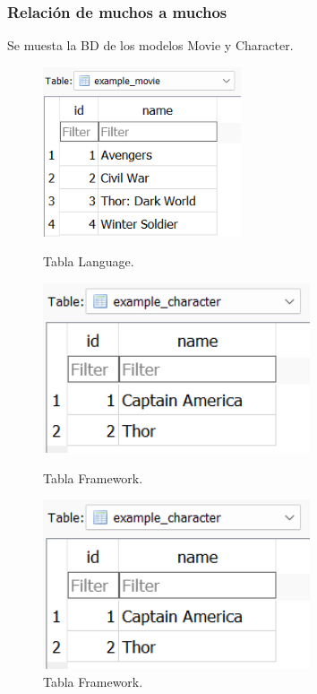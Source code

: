 \documentclass{article}
\begin{document}
\subsubsection{Relación de muchos a muchos}
Se muesta la BD de los modelos Movie y Character.
\begin{figure}[H]
	\centering
	\begin{minipage}{0.3\textwidth}
		\includegraphics[width=\linewidth, height=5cm, keepaspectratio]{img/r2tabla1.png}
		\caption{Tabla Language.}
	\end{minipage}
	\hspace{0.5cm} %
	\begin{minipage}{0.3\textwidth}
		\centering
		\includegraphics[width=\linewidth, height=5cm, keepaspectratio]{img/r2tabla2.png}
		\caption{Tabla Framework.}
	\end{minipage}
	\begin{minipage}{0.3\textwidth}
		\centering
		\includegraphics[width=\linewidth, height=5cm, keepaspectratio]{img/r2tabla2.png}
		\caption{Tabla Framework.}
	\end{minipage}
\end{figure}
\end{document}
